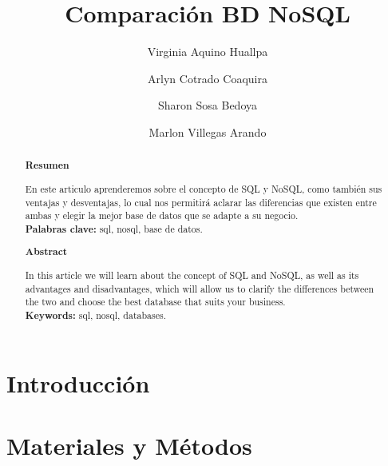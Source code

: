 \documentclass[%
 reprint,
 amsmath,amssymb,
 aps,
]{revtex4-1}
\begin{document}
\title{Comparación BD NoSQL}
\author{Virginia Aquino Huallpa}
\author{Arlyn Cotrado Coaquira}
\author{Sharon Sosa Bedoya}
\author{Marlon Villegas Arando}
%


\begin{abstract}
\begin{center}
\textbf{Resumen}
\end{center}

En este articulo aprenderemos sobre el concepto de SQL y NoSQL, como también sus ventajas y desventajas, lo cual nos permitirá aclarar las diferencias que existen entre ambas y elegir la mejor base de datos que se adapte a su negocio.\\

\textbf{Palabras clave:}   sql, nosql, base de datos.\\

\begin{center}
\textbf{Abstract}
\end{center}
In this article we will learn about the concept of SQL and NoSQL, as well as its advantages and disadvantages, which will allow us to clarify the differences between the two and choose the best database that suits your business.\\
\textbf{Keywords:}   sql, nosql, databases.\\

\end{abstract}



\maketitle


\section {Introducción}\label{sec:1}



\section{Materiales y Métodos}\label{sec:2}


\end{document}
